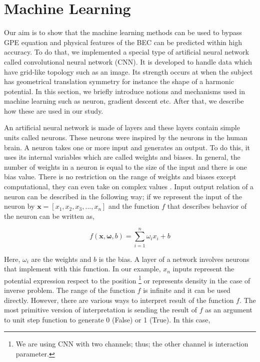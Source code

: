 \documentclass[a4paper,times,hidelinks,12pt]{article}
\begin{document}

\section{Machine Learning}
\label{sec:machine_learning}

Our aim is to show that the machine learning methods can be used to bypass GPE equation and physical features of the BEC can be predicted within high accuracy. To do that, we implemented a special type of artificial neural network called convolutional neural network (CNN). It is developed to handle data which have grid-like topology \cite{goodfellow2016deep} such as an image. Its strength occurs at when the subject has geometrical translation symmetry for instance the shape of a harmonic potential. In this section, we briefly introduce notions and mechanisms used in machine learning such as neuron, gradient descent etc. After that, we describe how these are used in our study.  

An artificial neural network is made of layers and these layers contain simple units called neurons. These neurons were inspired by the neurons in the human brain. A neuron takes one or more input and generates an output. To do this, it uses its internal variables which are called weights and biases. In general, the number of weights in a neuron is equal to the size of the input and there is one bias value. There is no restriction on the range of weights and biases except computational, they can even take on complex values \cite{zimmermann2011comparison}. Input output relation of a neuron can be described in the following way; if we represent the input of the neuron by $\boldsymbol{x} = [x_1, x_2, x_3, ..., x_n]$ and the function $f$ that describes behavior of the neuron can be written as, 

\begin{equation}
\label{eq:NU_neuron}
f(\boldsymbol{x}, \boldsymbol{\omega}, b) = \sum\limits_{i = 1}^n \omega_i x_i + b
\end{equation}

\noindent Here, $\omega_i$ are the weights and $b$ is the bias. A layer of a network involves neurons that implement with this function. In our example, $x_n$ inputs represent the potential expression respect to the position \footnote{We are using CNN with two channels; thus; the other channel is interaction parameter.} or represents density in the case of inverse problem. The range of the function $f$ is infinite and it can be used directly. However, there are various ways to interpret result of the function $f$. The most primitive version of interpretation is sending the result of $f$ as an argument to unit step function to generate 0 (False) or 1 (True). In this case, 
\end{document}
